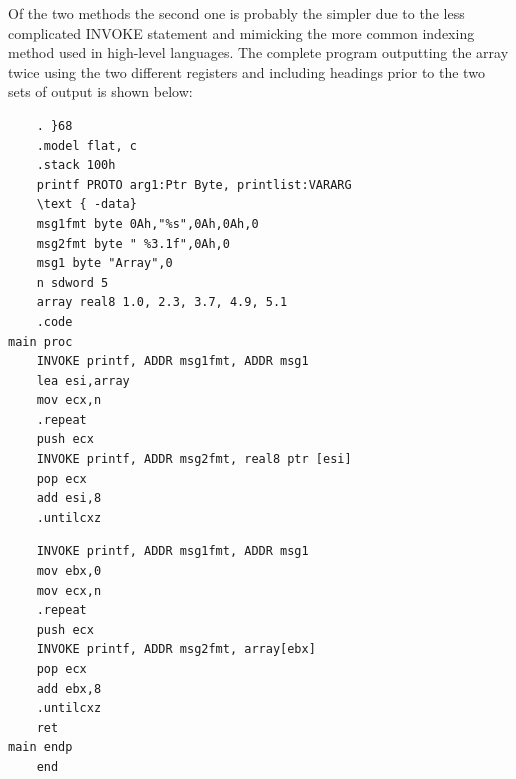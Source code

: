 \documentclass[10pt]{article}
\begin{document}
Of the two methods the second one is probably the simpler due to the less complicated INVOKE statement and mimicking the more common indexing method used in high-level languages. The complete program outputting the array twice using the two different registers and including headings prior to the two sets of output is shown below:

\begin{verbatim}
    . }68
    .model flat, c
    .stack 100h
    printf PROTO arg1:Ptr Byte, printlist:VARARG
    \text { -data}
    msg1fmt byte 0Ah,"%s",0Ah,0Ah,0
    msg2fmt byte " %3.1f",0Ah,0
    msg1 byte "Array",0
    n sdword 5
    array real8 1.0, 2.3, 3.7, 4.9, 5.1
    .code
main proc
    INVOKE printf, ADDR msg1fmt, ADDR msg1
    lea esi,array
    mov ecx,n
    .repeat
    push ecx
    INVOKE printf, ADDR msg2fmt, real8 ptr [esi]
    pop ecx
    add esi,8
    .untilcxz
\end{verbatim}

\begin{verbatim}
    INVOKE printf, ADDR msg1fmt, ADDR msg1
    mov ebx,0
    mov ecx,n
    .repeat
    push ecx
    INVOKE printf, ADDR msg2fmt, array[ebx]
    pop ecx
    add ebx,8
    .untilcxz
    ret
main endp
    end
\end{verbatim}
\end{document}
